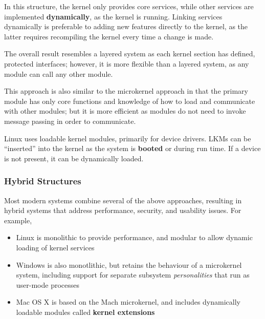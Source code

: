 \documentclass{article}
\begin{document}
In this structure, the kernel only provides core services, while other services are implemented \textbf{dynamically},
as the kernel is running. Linking services dynamically is preferable to adding new features directly to the
kernel, as the latter requires recompiling the kernel every time a change is made.

The overall result resembles a layered system as each kernel section has defined, protected interfaces; however,
it is more flexible than a layered system, as any module can call any other module.

This approach is also similar to the microkernel approach in that the primary module has only core functions and
knowledge of how to load and communicate with other modules; but it is more efficient as modules do not need to
invoke message passing in order to communicate.

Linux uses loadable kernel modules, primarily for device drivers. LKMs can be ``inserted'' into the kernel
as the system is \textbf{booted} or during run time. If a device is not present, it can be dynamically loaded.
\subsubsection{Hybrid Structures}
Most modern systems combine several of the above approaches, resulting in hybrid systems that address performance,
security, and usability issues. For example,
\begin{itemize}
    \item Linux is monolithic to provide performance, and modular to allow dynamic loading of kernel services
    \item Windows is also monotlithic, but retains the behaviour of a microkernel system, including support for separate subsystem \textit{personalities} that run as user-mode processes
    \item Mac OS X is based on the Mach microkernel, and includes dynamically loadable modules called \textbf{kernel extensions}
\end{itemize}
\end{document}
